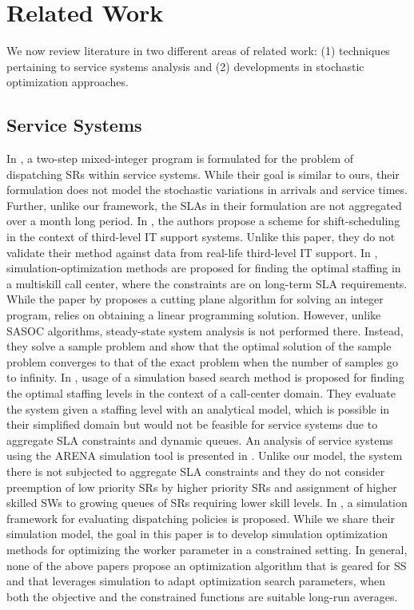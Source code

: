\documentclass[11pt,letterpaper,english]{article}
\begin{document}
\section{Related Work}
We now review literature in two different areas of related work: (1)
techniques pertaining to service systems analysis and (2) developments
in stochastic optimization approaches.

\subsection{Service Systems}
In \citep{vermaautomated}, a two-step mixed-integer program is
formulated for the problem of dispatching SRs within service systems.
While their goal is similar to ours, their formulation does not model
the stochastic variations in arrivals and service times. Further,
unlike our framework, the SLAs in their formulation are
not aggregated over a month long period.  In \citep{wasserkrug2008creating}, the authors propose
a scheme for shift-scheduling in the context of third-level IT support
systems.  Unlike this paper, they do not validate their method against
data from real-life third-level IT support.
In \citep{cezik2008staffing,bhulai2008simple}, simulation-optimization methods
are proposed for finding the optimal staffing in a multiskill call center,
where the constraints are on long-term SLA requirements. While the paper by
\citep{cezik2008staffing} proposes a cutting plane algorithm for solving an
integer program, \citep{bhulai2008simple} relies on obtaining a linear
programming solution. However, unlike SASOC algorithms, steady-state system
analysis is not performed there. Instead, they solve a sample problem and show
that the optimal solution of the sample problem converges to that of the exact
problem when the number of samples go to infinity. 
In \citep{robbins2008simulation}, usage
of a simulation based search method is proposed for finding the
optimal staffing levels in the context of a call-center domain.  They
evaluate the system given a staffing level with an analytical model,
which is possible in their simplified domain but would not be feasible
for service systems due to aggregate SLA constraints and dynamic
queues. An analysis of service systems using the ARENA
simulation tool is presented in \citep{brickner2010simulation}. Unlike
our model, the system there is not subjected to aggregate SLA
constraints and they do not consider preemption of
low priority SRs by higher priority SRs and assignment of higher
skilled SWs to growing queues of SRs requiring lower skill levels.
In \citep{banerjee2011simulation}, a
simulation framework for evaluating dispatching policies is
proposed. While we share their simulation model, the goal in this paper
is to develop simulation optimization methods for optimizing the worker parameter in a constrained setting.  In general, none of the above papers
propose an optimization algorithm that is geared for SS and that leverages simulation to adapt optimization search parameters, when both the objective and the constrained functions are suitable long-run averages.
\end{document}
